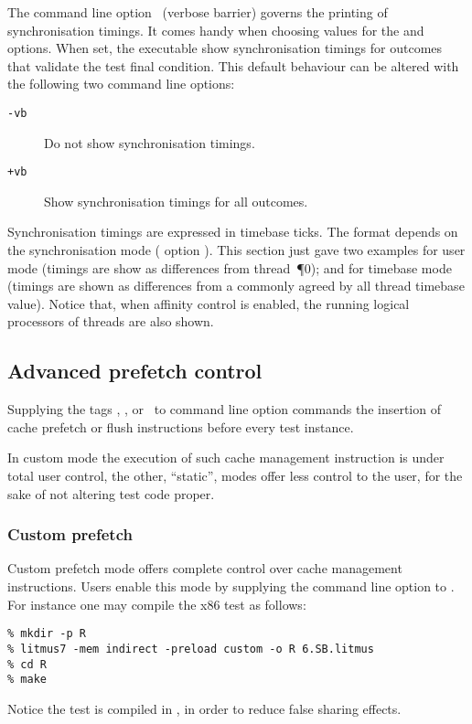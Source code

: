 The \litmus{} command line option~
(verbose barrier)
governs the printing of synchronisation timings. It comes handy when
choosing values for the  and  options.
When set, the executable show synchronisation timings
for outcomes that validate the test final condition.
This default behaviour can be altered with
the following two command line options:
\begin{description}
\item[{\tt -vb}] Do not show synchronisation timings.
\item[{\tt +vb}] Show synchronisation timings for all outcomes.
\end{description}
Synchronisation timings are expressed in timebase ticks.
The format depends on the synchronisation mode
(\litmus{} option ).
This section just gave two examples for user mode
(timings are show as differences from thread~\P{0}); and for
timebase mode (timings are shown as differences
from a commonly agreed by all thread timebase value).
Notice that, when affinity control is enabled,
the running logical processors of threads are also shown.

\subsection{Advanced \label{preload:custom}prefetch control}
Supplying the tags
, ,  or~ to
\litmus{} command line option 
commands the insertion of cache prefetch or flush
instructions before every test instance.

In custom mode the execution of such cache management instruction
is under total user control, the other, ``static'', modes offer
less control to the user, for the sake of not altering test code proper.

\subsubsection{Custom prefetch}
Custom prefetch mode offers complete control over
cache management instructions.
Users enable this mode by supplying the command line option
 to \litmus{}. For instance one may compile
the x86 test  as follows:
\begin{verbatim}
% mkdir -p R
% litmus7 -mem indirect -preload custom -o R 6.SB.litmus
% cd R
% make
\end{verbatim}
Notice the test is compiled in ,
in order to reduce false sharing effects.

